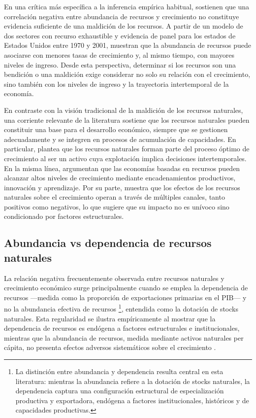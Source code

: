 \documentclass[../../TFM.tex]{subfiles}
\begin{document}
	En una crítica más específica a la inferencia empírica habitual, \textcite{Boyce2011} sostienen que una correlación negativa entre abundancia de recursos y crecimiento no constituye evidencia suficiente de una maldición de los recursos. A partir de un modelo de dos sectores con recurso exhaustible y evidencia de panel para los estados de Estados Unidos entre 1970 y 2001, muestran que la abundancia de recursos puede asociarse con menores tasas de crecimiento y, al mismo tiempo, con mayores niveles de ingreso. Desde esta perspectiva, determinar si los recursos son una bendición o una maldición exige considerar no solo su relación con el crecimiento, sino también con los niveles de ingreso y la trayectoria intertemporal de la economía.
	
	En contraste con la visión tradicional de la maldición de los recursos naturales, una corriente relevante de la literatura sostiene que los recursos naturales pueden constituir una base para el desarrollo económico, siempre que se gestionen adecuadamente y se integren en procesos de acumulación de capacidades. En particular, \textcite{Stiglitz1974} plantea que los recursos naturales forman parte del proceso óptimo de crecimiento al ser un activo cuya explotación implica decisiones intertemporales. En la misma línea, \textcite{DeFerranti2002} argumentan que las economías basadas en recursos pueden alcanzar altos niveles de crecimiento mediante encadenamientos productivos, innovación y aprendizaje. Por su parte, \textcite{Stijns2005} muestra que los efectos de los recursos naturales sobre el crecimiento operan a través de múltiples canales, tanto positivos como negativos, lo que sugiere que su impacto no es unívoco sino condicionado por factores estructurales.
	
	\subsection{Abundancia vs dependencia de recursos naturales}
	\label{subsec:abundancia-vs-dependencia}
	
	La relación negativa frecuentemente observada entre recursos naturales y crecimiento económico surge principalmente cuando se emplea la dependencia de recursos —medida como la proporción de exportaciones primarias en el PIB— y no la abundancia efectiva de recursos \footnote{La distinción entre abundancia y dependencia resulta central en esta literatura: mientras la abundancia refiere a la dotación de stocks naturales, la dependencia captura una configuración estructural de especialización productiva y exportadora, endógena a factores institucionales, históricos y de capacidades productivas.}, entendida como la dotación de stocks naturales. Esta regularidad se ilustra empíricamente al mostrar que la dependencia de recursos es endógena a factores estructurales e institucionales, mientras que la abundancia de recursos, medida mediante activos naturales per cápita, no presenta efectos adversos sistemáticos sobre el crecimiento \parencite{Brunnschweiler2008}.
	
\end{document}

